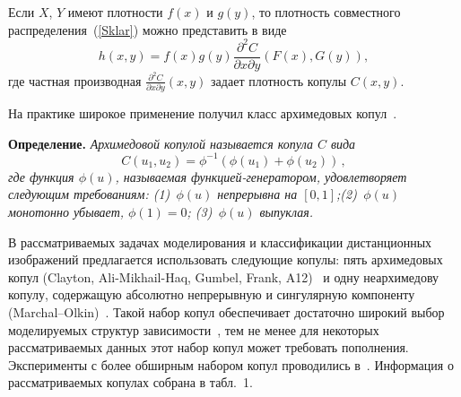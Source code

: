\begin{multicols}{2}
\smallskip

Если $X$, $Y$ имеют плотности $f(x)$ и $g(y)$, то плотность совместного распределения~(\ref{Sklar}) можно представить в виде
\begin{equation}\label{Sklar_pdfs}
h(x,y) = f(x)g(y)\frac{\partial^2 C}{\partial x \partial y}(F(x),G(y)),
\end{equation}
где частная производная $\frac{\partial^2 C}{\partial x  \partial y}(x,y)$ задает плотность копулы $C(x,y)$.

На практике широкое применение получил класс архимедовых копул~\cite{Nelsen}.

\smallskip

\noindent
\textbf{Определение.} \textit{Архимедовой копулой называется копула $C$ вида}
$$
C(u_1, u_2) = \phi^{-1}(\phi(u_1) + \phi(u_2))\,,
$$
\textit{где функция $\phi(u)$, называемая \textit{функцией-ге\-не\-ра\-то\-ром}, удовлетворяет следующим требованиям:
(1)~$\phi(u)$ непрерывна на $[0,1]$;\quad (2)~$\phi(u)$ монотонно убывает, $\phi(1)=0$; (3)~$\phi(u)$ выпуклая.}

\smallskip

В рассматриваемых задачах моделирования и классификации
дистанционных изображений предлагается использовать следующие
копулы: пять архимедовых копул (Clayton, Ali-Mikhail-Haq, Gumbel,
Frank, A12)~\cite{Nelsen} и одну неархимедову копулу, содержащую
абсолютно непрерывную и сингулярную компоненту
(Marchal--Olkin)~\cite{Nelsen}. Такой набор копул обеспечивает
достаточно широкий выбор моделируемых структур
зависимости~\cite{Huard}, тем не менее для некоторых рассматриваемых
данных этот набор копул может требовать пополнения. Эксперименты с
более обширным набором копул проводились в~\cite{KrylovRR09}.
Информация о рассматриваемых копулах собрана в табл.~1.

\begin{table*}\small
\begin{center}
\vspace*{2ex}


\end{center}
\end{table*}
\end{multicols}
